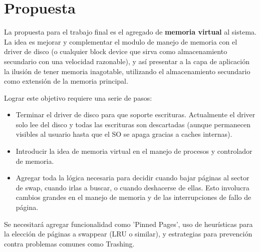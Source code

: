 \section{Propuesta}

La propuesta para el trabajo final es el agregado de \textbf{memoria virtual} al sistema.
La idea es mejorar y complementar el modulo de manejo de memoria con el driver
de disco (o cualquier block device que sirva como almacenamiento secundario con
una velocidad razonable), y así presentar a la capa de aplicación la ilusión de
tener memoria inagotable, utilizando el almacenamiento secundario como extensión
de la memoria principal.

Lograr este objetivo requiere una serie de pasos:

\begin{itemize}
  \item Terminar el driver de disco para que soporte escrituras. Actualmente el
      driver solo lee del disco y todas las escrituras son descartadas (aunque
      permanecen visibles al usuario hasta que el SO se apaga gracias a caches
      internas).
  \item Introducir la idea de memoria virtual en el manejo de procesos
      y controlador de memoria.
  \item Agregar toda la lógica necesaria para decidir cuando bajar páginas
      al sector de swap, cuando irlas a buscar, o cuando deshacerse de ellas.
      Esto involucra cambios grandes en el manejo de memoria y de las
      interrupciones de fallo de página. 
\end{itemize}

Se necesitará agregar funcionalidad como 'Pinned Pages', uso de heurísticas para
la elección de páginas a swappear (LRU o similar), y estrategias para prevención
contra problemas comunes como Trashing.
